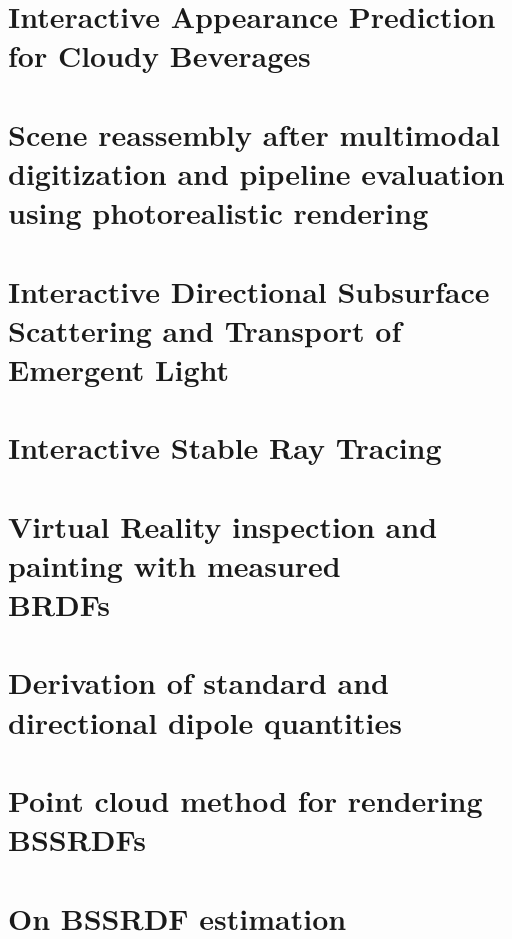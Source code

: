 \chapter{Interactive Appearance Prediction for Cloudy Beverages}
\label{sec:juice}
\label{sec:firstcontribution}

%
\chapter{Scene reassembly after multimodal digitization and pipeline evaluation using photorealistic rendering}
\label{sec:glass}

%
\chapter{Interactive Directional Subsurface Scattering and Transport of Emergent Light}
\label{sec:interactivedirsss}

%
\chapter{Interactive Stable Ray Tracing}
\label{sec:srt}

%
\chapter{Virtual Reality inspection and painting with measured \\BRDFs}
\label{sec:vrbrdf}
\label{sec:lastcontribution}

%
\chapter{Derivation of standard and directional dipole quantities}
\label{sec:jensennote}

%
\chapter{Point cloud method for rendering BSSRDFs}
\label{sec:pointcloudnote}

%
\chapter{On BSSRDF estimation}
\label{sec:bssrdfnote}

%
%
%
